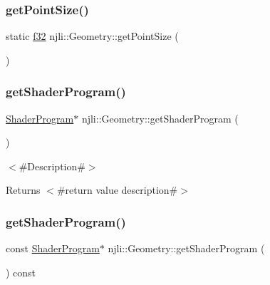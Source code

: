 \subsubsection{\texorpdfstring{get\+Point\+Size()}{getPointSize()}}
{\footnotesize\ttfamily static \mbox{\hyperlink{_util_8h_a5f6906312a689f27d70e9d086649d3fd}{f32}} njli\+::\+Geometry\+::get\+Point\+Size (\begin{DoxyParamCaption}{ }\end{DoxyParamCaption})\hspace{0.3cm}{\ttfamily [static]}}

\mbox{\label{classnjli_1_1_geometry_af5c8c5bf7cfb1945e7d5dded1a0c09a9}} 
\subsubsection{\texorpdfstring{get\+Shader\+Program()}{getShaderProgram()}\hspace{0.1cm}{\footnotesize\ttfamily [1/2]}}
{\footnotesize\ttfamily \mbox{\hyperlink{classnjli_1_1_shader_program}{Shader\+Program}}$\ast$ njli\+::\+Geometry\+::get\+Shader\+Program (\begin{DoxyParamCaption}{ }\end{DoxyParamCaption})}

$<$\#\+Description\#$>$

\begin{DoxyReturn}{Returns}
$<$\#return value description\#$>$ 
\end{DoxyReturn}
\mbox{\label{classnjli_1_1_geometry_af174791330137117465516251b7b3da7}} 
\subsubsection{\texorpdfstring{get\+Shader\+Program()}{getShaderProgram()}\hspace{0.1cm}{\footnotesize\ttfamily [2/2]}}
{\footnotesize\ttfamily const \mbox{\hyperlink{classnjli_1_1_shader_program}{Shader\+Program}}$\ast$ njli\+::\+Geometry\+::get\+Shader\+Program (\begin{DoxyParamCaption}{ }\end{DoxyParamCaption}) const}

